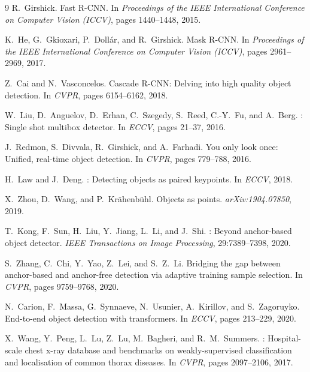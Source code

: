 \documentclass[11pt,a4paper]{article}
\begin{document}
\begin{thebibliography}{9}
R.~Girshick.
\newblock Fast {R-CNN}.
\newblock In \emph{Proceedings of the IEEE International Conference on Computer Vision (ICCV)}, pages 1440--1448, 2015.

K.~He, G.~Gkioxari, P.~Doll\'{a}r, and R.~Girshick.
\newblock Mask {R-CNN}.
\newblock In \emph{Proceedings of the IEEE International Conference on Computer Vision (ICCV)}, pages 2961--2969, 2017.

Z.~Cai and N.~Vasconcelos.
\newblock Cascade {R-CNN}: Delving into high quality object detection.
\newblock In \emph{CVPR}, pages 6154--6162, 2018.

W.~Liu, D.~Anguelov, D.~Erhan, C.~Szegedy, S.~Reed, C.-Y.~Fu, and A.~Berg.
: Single shot multibox detector.
\newblock In \emph{ECCV}, pages 21--37, 2016.

J.~Redmon, S.~Divvala, R.~Girshick, and A.~Farhadi.
\newblock You only look once: Unified, real-time object detection.
\newblock In \emph{CVPR}, pages 779--788, 2016.

H.~Law and J.~Deng.
: Detecting objects as paired keypoints.
\newblock In \emph{ECCV}, 2018.

X.~Zhou, D.~Wang, and P.~Kr\"{a}henb\"{u}hl.
\newblock Objects as points.
\newblock \emph{arXiv:1904.07850}, 2019.

T.~Kong, F.~Sun, H.~Liu, Y.~Jiang, L.~Li, and J.~Shi.
: Beyond anchor-based object detector.
\newblock \emph{IEEE Transactions on Image Processing}, 29:7389--7398, 2020.

S.~Zhang, C.~Chi, Y.~Yao, Z.~Lei, and S.~Z.~Li.
\newblock Bridging the gap between anchor-based and anchor-free detection via adaptive training sample selection.
\newblock In \emph{CVPR}, pages 9759--9768, 2020.

N.~Carion, F.~Massa, G.~Synnaeve, N.~Usunier, A.~Kirillov, and S.~Zagoruyko.
\newblock End-to-end object detection with transformers.
\newblock In \emph{ECCV}, pages 213--229, 2020.

X.~Wang, Y.~Peng, L.~Lu, Z.~Lu, M.~Bagheri, and R.~M.~Summers.
: Hospital-scale chest x-ray database and benchmarks on weakly-supervised classification and localisation of common thorax diseases.
\newblock In \emph{CVPR}, pages 2097--2106, 2017.


\end{thebibliography}
\end{document}
